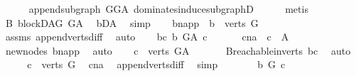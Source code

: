 \begin{isabellebody}
\ \ \ \ \isamarkupfalse%
\ append{\isacharunderscore}{\kern0pt}subgraph\ GG{\isacharunderscore}{\kern0pt}A\ dominates{\isacharunderscore}{\kern0pt}induce{\isacharunderscore}{\kern0pt}subgraphD\isanewline
\ \ \ \ \isamarkupfalse%
\ metis\ \ \ \ \isanewline
{}\isamarkupfalse%
\isanewline
\ \ \isamarkupfalse%
\ B{}{\isacharcolon}{\kern0pt}\ blockDAG\ G{\isacharunderscore}{\kern0pt}A\ \isamarkupfalse%
\ bD{\isacharunderscore}{\kern0pt}A\ \isamarkupfalse%
\ simp\isanewline
\ \ \isamarkupfalse%
\ b{\isacharunderscore}{\kern0pt}napp\ {\isacharcolon}{\kern0pt}\ {\isachardoublequoteopen}b\ {\isasymin}\ verts\ G{\isachardoublequoteclose}\ \isamarkupfalse%
\ assms{\isacharparenleft}{\kern0pt}{}{\isacharparenright}{\kern0pt}\ append{\isacharunderscore}{\kern0pt}verts{\isacharunderscore}{\kern0pt}diff\ \isamarkupfalse%
\ auto\isanewline
\ \ \isamarkupfalse%
\ bc{\isacharcolon}{\kern0pt}\ {\isachardoublequoteopen}b\ {\isasymrightarrow}\isactrlbsub G{\isacharunderscore}{\kern0pt}A\isactrlesub \ c{\isachardoublequoteclose}\ \isanewline
\ \ \isamarkupfalse%
\ \isamarkupfalse%
\ c{\isacharunderscore}{\kern0pt}na{\isacharcolon}{\kern0pt}\ \ {\isachardoublequoteopen}c\ {\isasymnotin}\ A{\isachardoublequoteclose}\ \isamarkupfalse%
\ new{\isacharunderscore}{\kern0pt}nodes\ b{\isacharunderscore}{\kern0pt}napp\ \isamarkupfalse%
\ auto\isanewline
\ \ \isamarkupfalse%
\ {\isachardoublequoteopen}c\ {\isasymin}\ verts\ G{\isacharunderscore}{\kern0pt}A{\isachardoublequoteclose}\ \isanewline
\ \ \ \ \isamarkupfalse%
\ B{}{\isachardot}{\kern0pt}reachable{}{\isacharunderscore}{\kern0pt}in{\isacharunderscore}{\kern0pt}verts{\isacharparenleft}{\kern0pt}{}{\isacharparenright}{\kern0pt}\ bc\ \isamarkupfalse%
\ auto\isanewline
\ \ \isamarkupfalse%
\ \isamarkupfalse%
\ {\isachardoublequoteopen}c\ {\isasymin}\ verts\ G{\isachardoublequoteclose}\ \isamarkupfalse%
\ c{\isacharunderscore}{\kern0pt}na\ \isamarkupfalse%
\ append{\isacharunderscore}{\kern0pt}verts{\isacharunderscore}{\kern0pt}diff{\isacharprime}{\kern0pt}\ \isamarkupfalse%
\ simp\ \ \isanewline
\ \ \isamarkupfalse%
\ \isamarkupfalse%
\ {\isachardoublequoteopen}b\ {\isasymrightarrow}\isactrlbsub G\isactrlesub \ c{\isachardoublequoteclose}\ \ \isamarkupfalse%

\end{isabellebody}
